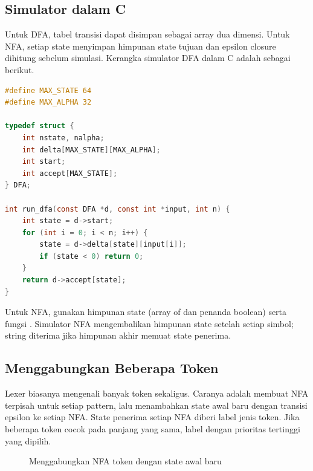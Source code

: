 \subsection{Simulator dalam C}

Untuk DFA, tabel transisi dapat disimpan sebagai array dua dimensi.
Untuk NFA, setiap state menyimpan himpunan state tujuan dan epsilon
closure dihitung sebelum simulasi. Kerangka simulator DFA dalam C
adalah sebagai berikut.

\begin{lstlisting}[language=C]
#define MAX_STATE 64
#define MAX_ALPHA 32

typedef struct {
    int nstate, nalpha;
    int delta[MAX_STATE][MAX_ALPHA];
    int start;
    int accept[MAX_STATE];
} DFA;

int run_dfa(const DFA *d, const int *input, int n) {
    int state = d->start;
    for (int i = 0; i < n; i++) {
        state = d->delta[state][input[i]];
        if (state < 0) return 0;
    }
    return d->accept[state];
}
\end{lstlisting}

Untuk NFA, gunakan himpunan state (array of  dan penanda
boolean) serta fungsi . Simulator NFA
mengembalikan himpunan state setelah setiap simbol; string diterima
jika himpunan akhir memuat state penerima.

\subsection{Menggabungkan Beberapa Token}

Lexer biasanya mengenali banyak token sekaligus. Caranya adalah
membuat NFA terpisah untuk setiap pattern, lalu menambahkan state awal
baru dengan transisi epsilon ke setiap NFA. State penerima setiap NFA
diberi label jenis token. Jika beberapa token cocok pada panjang yang
sama, label dengan prioritas tertinggi yang dipilih.

\begin{figure}[H]
\centering
{}
\caption{Menggabungkan NFA token dengan state awal baru}
\label{fig:ch06-gabung}
\end{figure}

